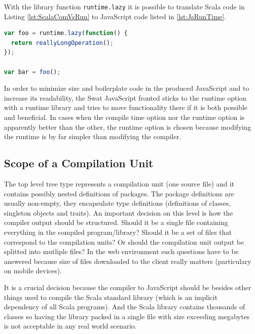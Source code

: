 \documentclass[12pt,a4paper]{report}
\begin{document}
With the library function \texttt{runtime.lazy} it is possible to translate Scala code in Listing \ref{lst:ScalaComVsRun} to JavaScript code listed in \ref{lst:JsRunTime}.

\begin{minipage}{\linewidth}
\begin{lstlisting}[language=JavaScript,caption={Runtime option outcome.},label={lst:JsRunTime}]
var foo = runtime.lazy(function() {
  return reallyLongOperation();
});

var bar = foo();
\end{lstlisting}
\end{minipage}

In order to minimize size and boilerplate code in the produced JavaScript and to increase its readability, the Swat JavaScript fronted sticks to the runtime option with a runtime library and tries to move functionality there if it is both possible and beneficial. In cases when the compile time option nor the runtime option is apparently better than the other, the runtime option is chosen because modifying the runtime is by far simpler than modifying the compiler.

\subsection{Scope of a Compilation Unit}

The top level tree type represents a compilation unit (one source file) and it contains possibly nested definitions of packages. The package definitions are usually non-empty, they encapsulate type definitions (definitions of classes, singleton objects and traits). An important decision on this level is how the compiler output should be structured. Should it be a single file containing everything in the compiled program/library? Should it be a set of files that correspond to the compilation units? Or should the compilation unit output be splitted into mutliple files? In the web environment such questions have to be answered because size of files downloaded to the client really matters (particulary on mobile devices).

It is a crucial decision because the compiler to JavaScript should be besides other things used to compile the Scala standard library \cite{ScalaLibrary} (which is an implicit dependency of all Scala programs). And the Scala library contains thousands of classes so having the library packed in a single file with size exceeding megabytes is not acceptable in any real world scenario.
\end{document}
